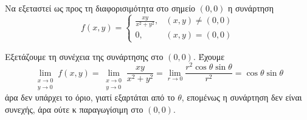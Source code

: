 \documentclass[a4paper,table]{report}
\begin{document}
\begin{example}
  Να εξεταστεί ως προς τη διαφορισιμότητα στο σημείο $(0,0)$ 
  η συνάρτηση 
  \[ 
    f(x,y) = 
    \begin{cases} 
      \frac{xy}{x^{2}+y^{2}}, &(x,y) \neq (0,0) \\ 0, & (x,y) = (0,0) 
    \end{cases} 
  \]
\end{example}
\begin{solution}
\item {}
  Εξετάζουμε τη συνέχεια της συνάρτησης στο $ (0,0) $. Έχουμε
  \[ \lim\limits_{\substack{x\to 0 \\y \to 0}} f(x,y) =
    \lim\limits_{\substack{x\to 0 \\y \to 0}} \frac{xy}{x^{2}+y^{2}} =
    \lim_{r \to 0} \frac{r^{2} \cos{\theta} \sin{\theta}}{r^{2}} =
  \cos{\theta} \sin{\theta} \] άρα δεν υπάρχει το όριο, γιατί εξαρτάται από το 
  $\theta$, επομένως η συνάρτηση δεν είναι συνεχής, άρα ούτε κ παραγωγίσιμη στο 
  $ (0,0) $.
\end{solution}
\end{document}
